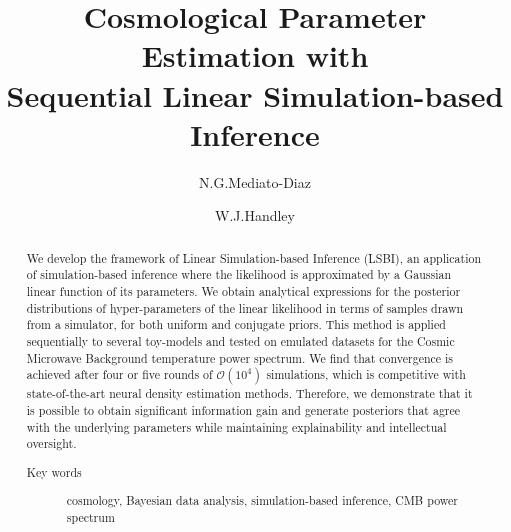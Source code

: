 \documentclass[%
 reprint,
 amsmath,amssymb,
 aps,
]{revtex4-2}
\begin{document}

\title{Cosmological Parameter Estimation with \\ Sequential Linear Simulation-based Inference}%

\author{N.\;G.\;Mediato\hspace{1.3pt}-Diaz}
%

\author{W.\;J.\;Handley}
%

\begin{abstract}
\vspace{2mm}
We develop the framework of Linear Simulation-based Inference (LSBI), an application of simulation-based inference where the likelihood is approximated by a Gaussian linear function of its parameters. We obtain analytical expressions for the posterior distributions of hyper-parameters of the linear likelihood in terms of samples drawn from a simulator, for both uniform and conjugate priors.  This method is applied sequentially to several toy-models and tested on emulated datasets for the Cosmic Microwave Background temperature power spectrum. We find that convergence is achieved after four or five rounds of $\mathcal{O}(10^4)$ simulations, which is competitive with state-of-the-art neural density estimation methods. Therefore, we demonstrate that it is possible to obtain significant information gain and generate posteriors that agree with the underlying parameters while maintaining explainability and intellectual oversight.


\vspace{2mm}
\begin{description}
\item[Key words]
 cosmology, Bayesian data analysis, simulation-based inference, CMB power spectrum
\end{description}
\end{abstract}

\maketitle

\end{document}
